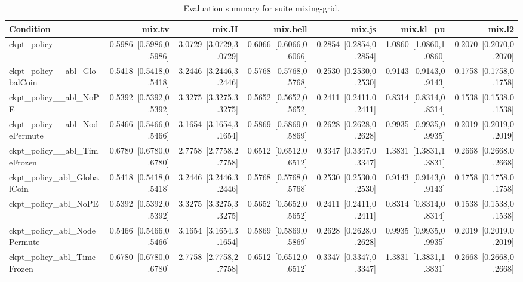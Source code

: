 \begin{table}[t]
\centering
\caption{Evaluation summary for suite mixing-grid.}
\label{tab:eval_mixing-grid}
\begin{tabular}{lrrrrrr}
\toprule
Condition & mix.tv & mix.H & mix.hell & mix.js & mix.kl\_pu & mix.l2 \\
\midrule
ckpt\_policy & 0.5986~[0.5986,0.5986] & 3.0729~[3.0729,3.0729] & 0.6066~[0.6066,0.6066] & 0.2854~[0.2854,0.2854] & 1.0860~[1.0860,1.0860] & 0.2070~[0.2070,0.2070] \\
ckpt\_policy\_\_abl\_GlobalCoin & 0.5418~[0.5418,0.5418] & 3.2446~[3.2446,3.2446] & 0.5768~[0.5768,0.5768] & 0.2530~[0.2530,0.2530] & 0.9143~[0.9143,0.9143] & 0.1758~[0.1758,0.1758] \\
ckpt\_policy\_\_abl\_NoPE & 0.5392~[0.5392,0.5392] & 3.3275~[3.3275,3.3275] & 0.5652~[0.5652,0.5652] & 0.2411~[0.2411,0.2411] & 0.8314~[0.8314,0.8314] & 0.1538~[0.1538,0.1538] \\
ckpt\_policy\_\_abl\_NodePermute & 0.5466~[0.5466,0.5466] & 3.1654~[3.1654,3.1654] & 0.5869~[0.5869,0.5869] & 0.2628~[0.2628,0.2628] & 0.9935~[0.9935,0.9935] & 0.2019~[0.2019,0.2019] \\
ckpt\_policy\_\_abl\_TimeFrozen & 0.6780~[0.6780,0.6780] & 2.7758~[2.7758,2.7758] & 0.6512~[0.6512,0.6512] & 0.3347~[0.3347,0.3347] & 1.3831~[1.3831,1.3831] & 0.2668~[0.2668,0.2668] \\
ckpt\_policy\_abl\_GlobalCoin & 0.5418~[0.5418,0.5418] & 3.2446~[3.2446,3.2446] & 0.5768~[0.5768,0.5768] & 0.2530~[0.2530,0.2530] & 0.9143~[0.9143,0.9143] & 0.1758~[0.1758,0.1758] \\
ckpt\_policy\_abl\_NoPE & 0.5392~[0.5392,0.5392] & 3.3275~[3.3275,3.3275] & 0.5652~[0.5652,0.5652] & 0.2411~[0.2411,0.2411] & 0.8314~[0.8314,0.8314] & 0.1538~[0.1538,0.1538] \\
ckpt\_policy\_abl\_NodePermute & 0.5466~[0.5466,0.5466] & 3.1654~[3.1654,3.1654] & 0.5869~[0.5869,0.5869] & 0.2628~[0.2628,0.2628] & 0.9935~[0.9935,0.9935] & 0.2019~[0.2019,0.2019] \\
ckpt\_policy\_abl\_TimeFrozen & 0.6780~[0.6780,0.6780] & 2.7758~[2.7758,2.7758] & 0.6512~[0.6512,0.6512] & 0.3347~[0.3347,0.3347] & 1.3831~[1.3831,1.3831] & 0.2668~[0.2668,0.2668] \\
\bottomrule
\end{tabular}
\end{table}
